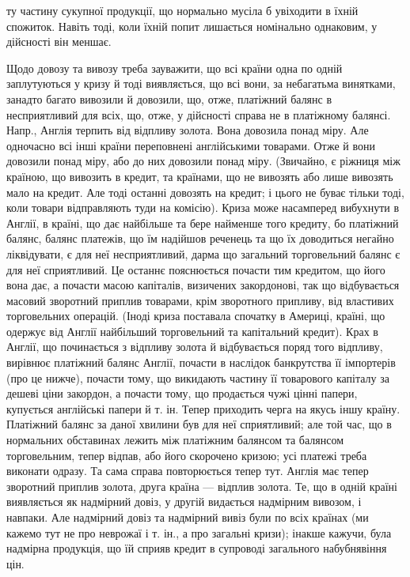 \parcont{}  %
ту частину сукупної продукції, що нормально мусіла б увіходити в їхній спожиток.
Навіть тоді, коли їхній попит лишається номінально однаковим, у дійсності він
меншає.

Щодо довозу та вивозу треба зауважити, що всі країни одна по одній
заплутуються у кризу й тоді виявляється, що всі вони, за небагатьма винятками,
занадто багато вивозили й довозили, що, отже, платіжний балянс в несприятливий
для всіх, що, отже, у дійсності справа не в платіжному балянсі.
Напр., Англія терпить від відпливу золота. Вона довозила понад міру. Але одночасно
всі інші країни переповнені англійськими товарами. Отже й вони довозили
понад міру, або до них довозили понад міру. (Звичайно, є ріжниця між країною,
що вивозить в кредит, та країнами, що не вивозять або лише вивозять мало
на кредит. Але тоді останні довозять на кредит; і цього не буває тільки тоді,
коли товари відправляють туди на комісію). Криза може насамперед вибухнути
в Англії, в країні, що дає найбільше та бере найменше того кредиту, бо платіжний
балянс, балянс платежів, що їм надійшов реченець та що їх доводиться
негайно ліквідувати, є для неї несприятливий, дарма що загальний торговельний
балянс є для неї сприятливий. Це останнє пояснюється почасти тим
кредитом, що його вона дає, а почасти масою капіталів, визичених закордонові,
так що відбувається масовий зворотний приплив товарами, крім зворотного припливу,
від властивих торговельних операцій. (Іноді криза поставала спочатку в
Америці, країні, що одержує від Англії найбільший торговельний та капітальний
кредит). Крах в Англії, що починається з відпливу золота й відбувається поряд того
відпливу, вирівнює платіжний балянс Англії, почасти в наслідок банкрутства її
імпортерів (про це нижче), почасти тому, що викидають частину її товарового капіталу
за дешеві ціни закордон, а почасти тому, що продається чужі цінні папери,
купується англійські папери й т. ін. Тепер приходить черга на якусь іншу
країну. Платіжний балянс за даної хвилини був для неї сприятливий; але той
час, що в нормальних обставинах лежить між платіжним балянсом та балянсом
торговельним, тепер відпав, або його скорочено кризою; усі платежі треба виконати
одразу. Та сама справа повторюється тепер тут. Англія має тепер зворотний
приплив золота, друга країна — відплив золота. Те, що в одній країні виявляється
як надмірний довіз, у другій видається надмірним вивозом, і навпаки. Але надмірний
довіз та надмірний вивіз були по всіх країнах (ми кажемо тут не про
неврожаї і т. ін., а про загальні кризи); інакше кажучи, була надмірна продукція,
що їй сприяв кредит в супроводі загального набубнявіння цін.

